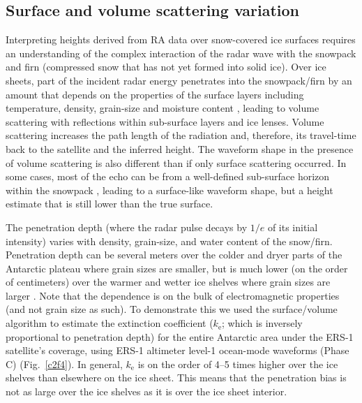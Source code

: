 \subsection{Surface and volume scattering variation}
\label{sec:bs-variation}

\noindent
Interpreting heights derived from RA data over snow-covered ice surfaces requires an understanding of the complex interaction of the radar wave with the snowpack and firn (compressed snow that has not yet formed into solid ice). Over ice sheets, part of the incident radar energy penetrates into the snowpack/firn \parencite{Ridley1988} by an amount that depends on the properties of the surface layers including temperature, density, grain-size and moisture content \parencite{Davis1993}, leading to volume scattering with reflections within sub-surface layers and ice lenses. Volume scattering increases the path length of the radiation and, therefore, its travel-time back to the satellite and the inferred height. The waveform shape in the presence of volume scattering is also different than if only surface scattering occurred. In some cases, most of the echo can be from a well-defined sub-surface horizon within the snowpack \parencite{Thomas2008}, leading to a surface-like waveform shape, but a height estimate that is still lower than the true surface.

The penetration depth (where the radar pulse decays by $1/e$ of its initial intensity) varies with density, grain-size, and water content of the snow/firn. Penetration depth can be several meters over the colder and dryer parts of the Antarctic plateau where grain sizes are smaller, but is much lower (on the order of centimeters) over the warmer and wetter ice shelves where grain sizes are larger \parencite{Davis1996}. Note that the dependence is on the bulk of electromagnetic properties (and not grain size as such). To demonstrate this we used the \parencite{Davis1993} surface/volume algorithm to estimate the extinction coefficient ($k_\text{e}$; which is inversely proportional to penetration depth) for the entire Antarctic area under the ERS-1 satellite's coverage, using ERS-1 altimeter level-1 ocean-mode waveforms (Phase C) (Fig.~\ref{c2f4}). In general, $k_\text{e}$ is on the order of 4--5 times higher over the ice shelves than elsewhere on the ice sheet. This means that the penetration bias is not as large over the ice shelves as it is over the ice sheet interior.



